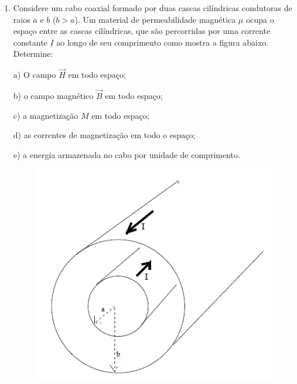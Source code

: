\begin{enumerate}[start=1,label={\bfseries Q\arabic*.}]
\resposta


\item Considere um cabo coaxial formado por duas cascas cilíndricas condutoras de raios $a$ e $b$ ($b > a$). Um material de permeabilidade magnética $\mu$ ocupa o espaço entre as cascas cilíndricas, que são percorridas por uma corrente constante $I$ ao longo de seu comprimento como mostra a figura abaixo. Determine:

a) O campo $\vec{H}$ em todo espaço;

\resposta

b) o campo magnético $\vec{B}$ em todo espaço;

\resposta

c) a magnetização $M$ em todo espaço;

\resposta

d) as correntes de magnetização em todo o espaço;

\resposta

e) a energia armazenada no cabo por unidade de comprimento.

\begin{figure}[H]
\centering
\includegraphics[scale=0.7]{eletromag-img/coaxial2.png}
\end{figure}

\resposta



\end{enumerate}
